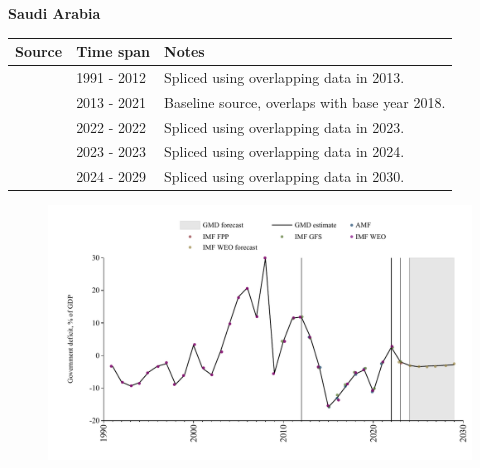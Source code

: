 \documentclass[12pt,a4paper,landscape]{article}
\begin{document}
\begin{adjustbox}{max totalsize={\paperwidth}{\paperheight},center}
\begin{minipage}[t][\textheight][t]{\textwidth}
\vspace*{0.5cm}
{}
\begin{center}
{\Large\bfseries Saudi Arabia}
\end{center}
\vspace{0.5cm}
\begin{table}[H]
\centering
\small
\begin{tabular}{|l|l|l|}
\hline
\textbf{Source} & \textbf{Time span} & \textbf{Notes} \\
\hline
\rowcolor{white}\cite{IMF_WEO}& 1991 - 2012 &Spliced using overlapping data in 2013.\\
\rowcolor{lightgray}\cite{AMF}& 2013 - 2021 &Baseline source, overlaps with base year 2018.\\
\rowcolor{white}\cite{IMF_WEO}& 2022 - 2022 &Spliced using overlapping data in 2023.\\
\rowcolor{lightgray}\cite{IMF_GFS}& 2023 - 2023 &Spliced using overlapping data in 2024.\\
\rowcolor{white}\cite{IMF_WEO_forecast}& 2024 - 2029 &Spliced using overlapping data in 2030.\\
\hline
\end{tabular}
\end{table}
\begin{figure}[H]
\centering
\includegraphics[width=\textwidth,height=0.6\textheight,keepaspectratio]{graphs/SAU_govdef_GDP.pdf}
\end{figure}
\end{minipage}
\end{adjustbox}
\end{document}
